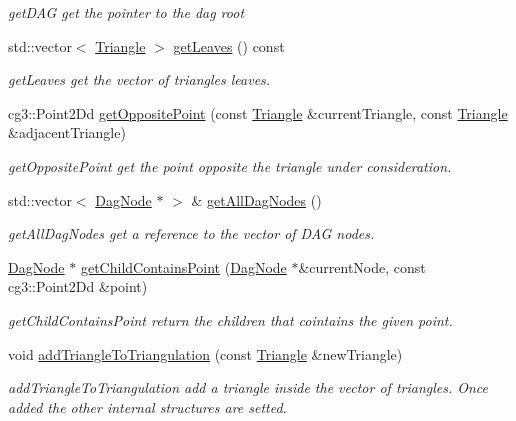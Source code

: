 \begin{DoxyCompactItemize}
\begin{DoxyCompactList}\small\item\em get\+D\+AG get the pointer to the dag root \end{DoxyCompactList}\item 
std\+::vector$<$ \hyperlink{classTriangle}{Triangle} $>$ \hyperlink{classDelaunayTriangulationAlgorithm_a50b04497d70c749b3d842553757446aa}{get\+Leaves} () const
\begin{DoxyCompactList}\small\item\em get\+Leaves get the vector of triangles leaves. \end{DoxyCompactList}\item 
cg3\+::\+Point2\+Dd \hyperlink{classDelaunayTriangulationAlgorithm_aa0aba43587d1e0bf1857594323c1ef2c}{get\+Opposite\+Point} (const \hyperlink{classTriangle}{Triangle} \&current\+Triangle, const \hyperlink{classTriangle}{Triangle} \&adjacent\+Triangle)
\begin{DoxyCompactList}\small\item\em get\+Opposite\+Point get the point opposite the triangle under consideration. \end{DoxyCompactList}\item 
std\+::vector$<$ \hyperlink{classDagNode}{Dag\+Node} $\ast$ $>$ \& \hyperlink{classDelaunayTriangulationAlgorithm_a0e969b0ca72a0b59e7f2c70046a9b5f5}{get\+All\+Dag\+Nodes} ()
\begin{DoxyCompactList}\small\item\em get\+All\+Dag\+Nodes get a reference to the vector of D\+AG nodes. \end{DoxyCompactList}\item 
\hyperlink{classDagNode}{Dag\+Node} $\ast$ \hyperlink{classDelaunayTriangulationAlgorithm_a39f9f779ccecd10fc472707f420b25de}{get\+Child\+Contains\+Point} (\hyperlink{classDagNode}{Dag\+Node} $\ast$\&current\+Node, const cg3\+::\+Point2\+Dd \&point)
\begin{DoxyCompactList}\small\item\em get\+Child\+Contains\+Point return the children that cointains the given point. \end{DoxyCompactList}\item 
void \hyperlink{classDelaunayTriangulationAlgorithm_a8782ae176a5b1b7045192ae079623ade}{add\+Triangle\+To\+Triangulation} (const \hyperlink{classTriangle}{Triangle} \&new\+Triangle)
\begin{DoxyCompactList}\small\item\em add\+Triangle\+To\+Triangulation add a triangle inside the vector of triangles. Once added the other internal structures are setted. \end{DoxyCompactList}\item 

\end{DoxyCompactItemize}
